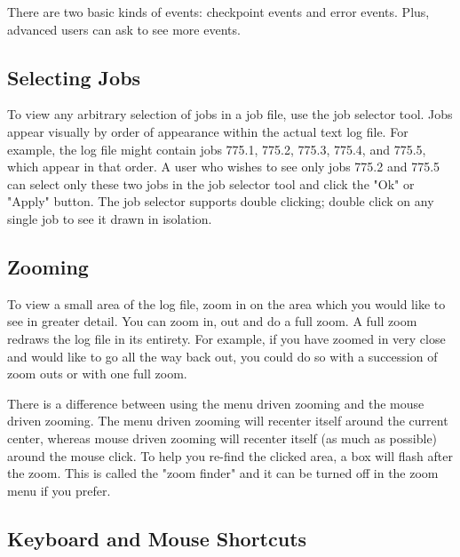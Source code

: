 There are two basic kinds of events: checkpoint events and error events.   
Plus, advanced users can ask to see more events. 


\subsection{\label{sec:job-selector}Selecting Jobs}

To view any arbitrary selection of jobs in a job file, use the job selector tool.  Jobs appear visually by order of appearance within the actual text log file.  For example, the log file might contain jobs
775.1, 775.2, 775.3, 775.4, and 775.5, which appear in that order.  A user who wishes to see only jobs 775.2 and 775.5 can select only these two jobs in the job selector tool and click the "Ok" or
"Apply" button.  The job selector supports double clicking; double
click on any single job to see it drawn in isolation. 

\subsection{\label{sec:zooming}Zooming}

To view a small area of the log file, zoom in on the area which you would like to see in greater detail. You can zoom in, out and do a full zoom. A full zoom redraws the log file in its entirety. For
example, if you have zoomed in very close and would like to go all the way back out, you could do so with a succession of zoom outs or with one full zoom. 

There is a difference between using the menu driven zooming and the mouse driven zooming. The menu driven zooming will recenter itself around the current center, whereas mouse driven
zooming will recenter itself (as much as possible) around the mouse click. To help you re-find the clicked area, a box will flash after the zoom. This is called the "zoom finder" and it can be turned
off in the zoom menu if you prefer. 

\subsection{\label{sec:k-m-shortcuts}Keyboard and Mouse Shortcuts}

